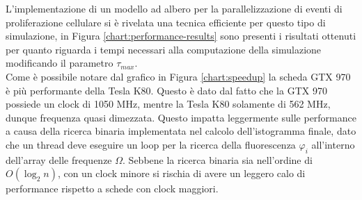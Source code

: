L'implementazione di un modello ad albero per la parallelizzazione di eventi
di proliferazione cellulare si è rivelata una tecnica efficiente per questo
tipo di simulazione, in Figura \ref{chart:performance-results}
sono presenti i risultati ottenuti per
quanto riguarda i tempi necessari alla computazione della simulazione
modificando il parametro $\tau_{max}$.
\\
Come è possibile notare dal grafico in Figura \ref{chart:speedup} la scheda
GTX 970 è più performante della Tesla K80. Questo è dato dal fatto che
la GTX 970 possiede un clock di 1050 MHz, mentre la Tesla K80 solamente di
562 MHz, dunque frequenza quasi dimezzata. Questo impatta leggermente sulle
performance a causa della ricerca binaria implementata nel calcolo
dell'istogramma finale, dato che un thread deve eseguire un loop per la ricerca
della fluorescenza $\varphi_{i}$ all'interno dell'array delle frequenze $\Omega$.
Sebbene la ricerca binaria sia nell'ordine di $O(\log_{2}{n})$, con un clock
minore si rischia di avere un leggero calo di performance rispetto a schede
con clock maggiori.
